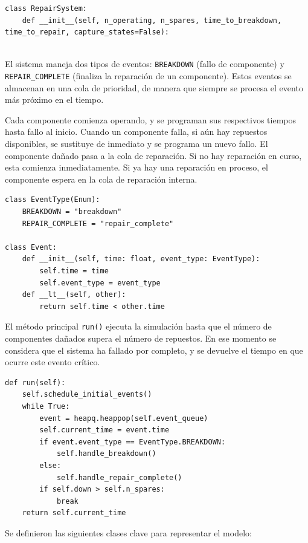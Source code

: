 \documentclass{article}
\begin{document}
\begin{lstlisting}[style=python, caption={Constructor de la clase RepairSystem}]
class RepairSystem:
    def __init__(self, n_operating, n_spares, time_to_breakdown, time_to_repair, capture_states=False):
      
\end{lstlisting}

El sistema maneja dos tipos de eventos: \texttt{BREAKDOWN} (fallo de componente) y \texttt{REPAIR\_COMPLETE} (finaliza la reparación de un componente). Estos eventos se almacenan en una cola de prioridad, de manera que siempre se procesa el evento más próximo en el tiempo.

Cada componente comienza operando, y se programan sus respectivos tiempos hasta fallo al inicio. Cuando un componente falla, si aún hay repuestos disponibles, se sustituye de inmediato y se programa un nuevo fallo. El componente dañado pasa a la cola de reparación. Si no hay reparación en curso, esta comienza inmediatamente. Si ya hay una reparación en proceso, el componente espera en la cola de reparación interna.

\begin{lstlisting}[style=python, caption={Clase Event y manejo de eventos}]
class EventType(Enum):
    BREAKDOWN = "breakdown"
    REPAIR_COMPLETE = "repair_complete"

class Event:
    def __init__(self, time: float, event_type: EventType):
        self.time = time
        self.event_type = event_type
    def __lt__(self, other):
        return self.time < other.time
\end{lstlisting}

El método principal \texttt{run()} ejecuta la simulación hasta que el número de componentes dañados supera el número de repuestos. En ese momento se considera que el sistema ha fallado por completo, y se devuelve el tiempo en que ocurre este evento crítico.

\begin{lstlisting}[style=python, caption={Ejecución del sistema}]
def run(self):
    self.schedule_initial_events()
    while True:
        event = heapq.heappop(self.event_queue)
        self.current_time = event.time
        if event.event_type == EventType.BREAKDOWN:
            self.handle_breakdown()
        else:
            self.handle_repair_complete()
        if self.down > self.n_spares:
            break
    return self.current_time
\end{lstlisting}

Se definieron las siguientes clases clave para representar el modelo:
\end{document}
